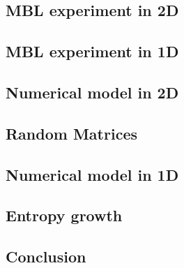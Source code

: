 \subsection{MBL experiment in 2D}






\subsection{MBL experiment in 1D}






\subsection{Numerical model in 2D}






\subsection{Random Matrices}






\subsection{Numerical model in 1D}





\subsection{Entropy growth}






\subsection{Conclusion}

